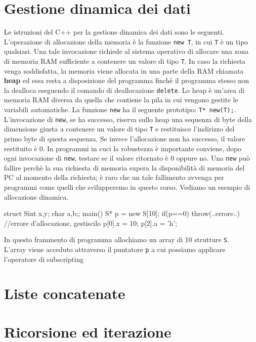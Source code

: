 \section{Gestione dinamica dei dati}
Le istruzioni del C++ per la gestione dinamica dei dati sono le seguenti. L'operazione di allocazione della memoria è la funzione \texttt{new T}, in cui \texttt{T} è un tipo qualsiasi. Una tale invocazione richiede al sistema operativo di allocare una zona di memoria RAM sufficiente a contenere un valore di tipo \texttt{T}. In caso la richiesta venga soddisfatta, la memoria viene allocata in una parte della RAM chiamata \textbf{heap} ed essa resta a disposizione del programma finchè il programma stesso non la dealloca eseguendo il comando di deallocazione \texttt{delete}. 
Lo heap è un'area di memoria RAM diversa da quella che contiene la pila in cui vengono gestite le variabili automatiche. La funzione \texttt{new} ha il seguente prototipo: \texttt{T* new(T);}. L'invocazione di \texttt{new}, se ha successo, riserva sullo heap una sequenza di byte della dimensione giusta a contenere un valore di tipo \texttt{T} e restituisce l'indirizzo del primo byte di questa sequenza. Se invece l'allocazione non ha successo, il valore restituito è 0. In programmi in cuci la robustezza è importante conviene, dopo ogni invocazione di \texttt{new}, testare se il valore ritornato è 0 oppure no. Una \texttt{new} può fallire perchè la sua richiesta di memoria supera la disponibilità di memoria del PC al momento della richiesta; è raro che un tale fallimento avvenga per programmi come quelli che svilupperemo in questo corso. Vediamo un esempio di allocazione dinamica. \\
\begin{codice}

    struct S{int x,y; char a,b;};
    main(){
        S* p = new S[10];
        if(p==0) throw(..errore..) //errore d'allocazione, gestiscilo
        p[0].x = 10;
        p[2].a = 'h';
    }
\end{codice}    
In questo frammento di programma allochiamo un array di 10 strutture \texttt{S}. L'array viene acceduto attraverso il puntatore \texttt{p} a cui possiamo applicare l'operatore di subscripting 


\section{Liste concatenate}

\section{Ricorsione ed iterazione}
